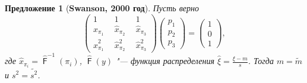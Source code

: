 \documentclass[12pt]{article}
\newtheorem{proposition}[theorem]{Предложение}
\DeclareMathOperator{\F}{\mathsf{F}}
\begin{document}
	
	\begin{proposition}[\textbf{Swanson, 2000 год}]\label{pr1}
		Пусть верно 
		\begin{equation}
			\begin{pmatrix} 
				1&1&1\\ 
				\hat{x}_{\pi_{1}}~~ &  \hat{x}_{\pi_{2}}~~  & \hat{x}_{\pi_{3}} \\ 
				\hat{x}_{\pi_{1}}^{2}~~&\hat{x}_{\pi_{2}}^{2}~~  &\hat{x}_{\pi_{3}}^{2}
			\end{pmatrix}
			\begin{pmatrix}p_{1}\\p_{2}\\ p_{3}\end{pmatrix}= \begin{pmatrix}1\\0\\1 \end{pmatrix},\label{4}
		\end{equation}
		где $\hat{x}_{\pi_{i}} = \hat{\F}^{-1}(\pi_{i})$, $\hat{\F}(y)$ "--- функция распределения $\displaystyle{\hat{\xi} = \frac{\xi-m}{s}}$. Тогда $m=\tilde{m}$ и $s^{2} = \tilde{s^{2}}$.
	\end{proposition}
\end{document}
